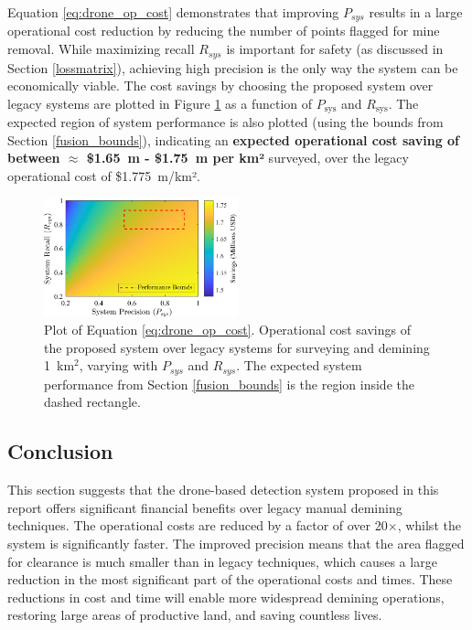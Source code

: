 Equation \ref{eq:drone_op_cost} demonstrates that improving $P_{sys}$ results in a large operational cost reduction by reducing the number of points flagged for mine removal. While maximizing recall $R_{sys}$ is important for safety (as discussed in Section \ref{lossmatrix}), achieving high precision is the only way the system can be economically viable. The cost savings by choosing the proposed system over legacy systems are plotted in Figure \ref{fig:financial_savings} as a function of $P_\text{sys}$ and $R_\text{sys}$. The expected region of system performance is also plotted (using the bounds from Section \ref{fusion_bounds}), indicating an \textbf{expected operational cost saving of between $\approx$ \$1.65~m - \$1.75~m per km²} surveyed, over the legacy operational cost of \$1.775~m/km². 


\begin{figure}[h!]
\centering
\includegraphics[width=0.5\textwidth]{figs/Rory/financial_savings.pdf} 
\caption[Operational Cost Savings as a Function of Computer Vision Performance]{Plot of Equation \ref{eq:drone_op_cost}. Operational cost savings of the proposed system over legacy systems for surveying and demining 1~km$^2$, varying with $P_{sys}$ and $R_{sys}$. The expected system performance from Section \ref{fusion_bounds} is the region inside the dashed rectangle.}
\label{fig:financial_savings}
\end{figure}


\subsection{Conclusion} \label{subsec:finance_conclusion}

This section suggests that the drone-based detection system proposed in this report offers significant financial benefits over legacy manual demining techniques. The operational costs are reduced by a factor of over 20$\times$, whilst the system is significantly faster. The improved precision means that the area flagged for clearance is much smaller than in legacy techniques, which causes a large reduction in the most significant part of the operational costs and times. These reductions in cost and time will enable more widespread demining operations, restoring large areas of productive land, and saving countless lives. 

